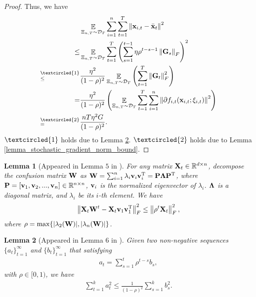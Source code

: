 \documentclass{article}
\newtheorem{Lemma}{\bf{Lemma}}
\begin{document}
\begin{proof}
Thus, we  have
\begin{align}
\nonumber
& \EE_{ \Xi_{n,T} \sim \Dcal_{T} } \sum_{i=1}^n\sum_{t=1}^T \lrnorm{\x_{i,t} - \bar{\x}_t}^2  \\ \nonumber 
\le & \EE_{ \Xi_{n,T} \sim \Dcal_{T} } \sum_{t=1}^T \lrincir{ \sum_{s=1}^{t-1} \eta \rho^{t-s-1} \lrnorm{\G_s}_F}^2  \\ \nonumber
\refabovecir{\le}{\textcircled{1}} & \frac{\eta^2}{(1-\rho)^2} \EE_{ \Xi_{n,T} \sim \Dcal_{T} } \lrincir{  \sum_{t=1}^T \lrnorm{\G_t}_F^2 } \\ \nonumber
= & \frac{\eta^2}{(1-\rho)^2} \lrincir{ \EE_{ \Xi_{n,T} \sim \Dcal_{T} } \sum_{t=1}^T \sum_{i=1}^n  \lrnorm{\partial f_{i,t}(\x_{i,t}; \xi_{i,t})}^2 } \\ \nonumber
\refabovecir{=}{\textcircled{2}} & \frac{nT\eta^2 G }{(1-\rho)^2}.
\end{align} $\textcircled{1}$ holds due to Lemma \ref{lemma_hanlin_2}.  $\textcircled{2}$ holds due to Lemma \ref{lemma_stochastic_gradient_norm_bound}.



\end{proof}








\begin{Lemma}[Appeared in Lemma $5$ in \citep{Tang:2018un}]
\label{lemma_hanlin_1}
For any matrix ${\bf X}_t\in\mathbb{R}^{d\times n}$, decompose the confusion matrix ${\bf W}$ as ${\bf W} = \sum_{i=1}^n \lambda_i {\bf v}_i {\bf v}_i^{\rm T} = {\bf P} \mathbf{\Lambda} {\bf P}^{\rm T}$, where ${\bf P} = [{\bf v}_1, {\bf v}_2, ..., {\bf v}_n]\in\mathbb{R}^{n\times n}$, ${\bf v}_i$ is the normalized eigenvector of $\lambda_i$. $\mathbf{\Lambda}$ is a diagonal matrix, and $\lambda_i$ be its $i$-th element. We have
\begin{align}
\nonumber
\left\lVert{\bf X}_t {\bf W}^t - {\bf X}_t {\bf v}_1 {\bf v}_1^{\rm T} \right\rVert_F^2 \le \left\lVert\rho^t {\bf X}_t\right\rVert_F^2, 
\end{align} where  $\rho = \max \{| \lambda_2({\bf W}) |, | \lambda_n({\bf W}) |\}$. 

\end{Lemma}


\begin{Lemma}[Appeared in Lemma $6$ in \citep{Tang:2018un}]
\label{lemma_hanlin_2}
Given two non-negative sequences $\{a_t\}_{t=1}^{\infty}$ and $\{b_t\}_{t=1}^{\infty}$ that satisfying
\begin{align}
\nonumber
a_t = \sum_{s=1}^t \rho^{t-s} b_s,
\end{align} with $\rho \in [0,1)$, we have
\begin{align}
\nonumber
\sum_{t=1}^k a_t^2 \le \frac{1}{(1-\rho)^2}\sum_{s=1}^k b_s^2.
\end{align}
\end{Lemma}
\end{document}
